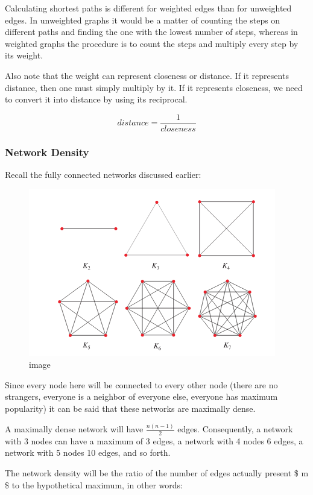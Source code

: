 Calculating shortest paths is different for weighted edges than for
unweighted edges. In unweighted graphs it would be a matter of counting
the steps on different paths and finding the one with the lowest number
of steps, whereas in weighted graphs the procedure is to count the steps
and multiply every step by its weight.

Also note that the weight can represent closeness or distance. If it
represents distance, then one must simply multiply by it. If it
represents closeness, we need to convert it into distance by using its
reciprocal.

\[ distance = \frac{1}{closeness} \]

    \hypertarget{network-density}{%
\subsubsection{Network Density}\label{network-density}}

Recall the fully connected networks discussed earlier:

\begin{figure}
\centering
\includegraphics{images/ch2/wolfram.png}
\caption{image}
\end{figure}

    Since every node here will be connected to every other node (there are
no strangers, everyone is a neighbor of everyone else, everyone has
maximum popularity) it can be said that these networks are maximally
dense.

A maximally dense network will have $ \frac{n(n-1)}{2} $ edges.
Consequently, a network with 3 nodes can have a maximum of 3 edges, a
network with 4 nodes 6 edges, a network with 5 nodes 10 edges, and so
forth.

The network density will be the ratio of the number of edges actually
present \$ m \$ to the hypothetical maximum, in other words:

